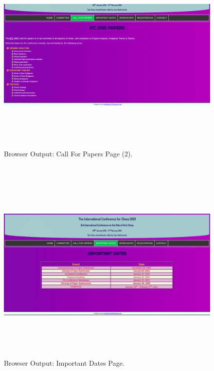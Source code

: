 \documentclass[12pt, a4]{article}
\begin{document}
\newpage
\begin{figure}[h]
\centering
\caption{Browser Output: Call For Papers Page (2).}
\includegraphics[height=10cm, width=18cm, keepaspectratio]{Output/Papers-2.png}
\end{figure}

\newpage
\subsection*{}
\begin{figure}[h]
\centering
\caption{Browser Output: Important Dates Page.}
\includegraphics[height=10cm, width=18cm, keepaspectratio]{Output/Dates.png}
\end{figure}
\end{document}
